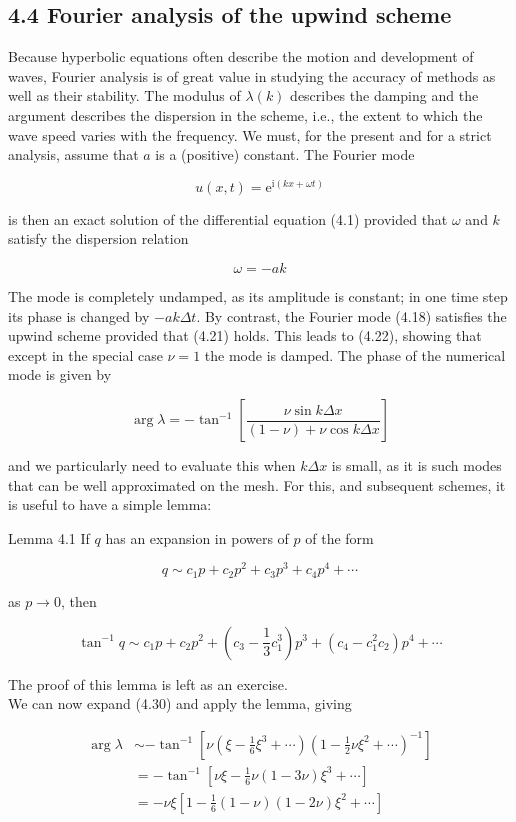 \documentclass[10pt]{article}
\begin{document}
\subsection*{4.4 Fourier analysis of the upwind scheme}
Because hyperbolic equations often describe the motion and development of waves, Fourier analysis is of great value in studying the accuracy of methods as well as their stability. The modulus of \(\lambda(k)\) describes the damping and the argument describes the dispersion in the scheme, i.e., the extent to which the wave speed varies with the frequency. We must, for the present and for a strict analysis, assume that \(a\) is a (positive) constant. The Fourier mode

\[
u(x, t)=\mathrm{e}^{\mathrm{i}(k x+\omega t)}
\]

is then an exact solution of the differential equation (4.1) provided that \(\omega\) and \(k\) satisfy the dispersion relation

\[
\omega=-a k
\]

The mode is completely undamped, as its amplitude is constant; in one time step its phase is changed by \(-a k \Delta t\). By contrast, the Fourier mode (4.18) satisfies the upwind scheme provided that (4.21) holds. This leads to (4.22), showing that except in the special case \(\nu=1\) the mode is damped. The phase of the numerical mode is given by

\[
\arg \lambda=-\tan ^{-1}\left[\frac{\nu \sin k \Delta x}{(1-\nu)+\nu \cos k \Delta x}\right]
\]

and we particularly need to evaluate this when \(k \Delta x\) is small, as it is such modes that can be well approximated on the mesh. For this, and subsequent schemes, it is useful to have a simple lemma:

Lemma 4.1 If \(q\) has an expansion in powers of \(p\) of the form

\[
q \sim c_{1} p+c_{2} p^{2}+c_{3} p^{3}+c_{4} p^{4}+\cdots
\]

as \(p \rightarrow 0\), then

\[
\tan ^{-1} q \sim c_{1} p+c_{2} p^{2}+\left(c_{3}-\frac{1}{3} c_{1}^{3}\right) p^{3}+\left(c_{4}-c_{1}^{2} c_{2}\right) p^{4}+\cdots
\]

The proof of this lemma is left as an exercise.\\
We can now expand (4.30) and apply the lemma, giving

\[
\begin{aligned}
\arg \lambda & \sim-\tan ^{-1}\left[\nu\left(\xi-\frac{1}{6} \xi^{3}+\cdots\right)\left(1-\frac{1}{2} \nu \xi^{2}+\cdots\right)^{-1}\right] \\
& =-\tan ^{-1}\left[\nu \xi-\frac{1}{6} \nu(1-3 \nu) \xi^{3}+\cdots\right] \\
& =-\nu \xi\left[1-\frac{1}{6}(1-\nu)(1-2 \nu) \xi^{2}+\cdots\right]
\end{aligned}
\]
\end{document}
